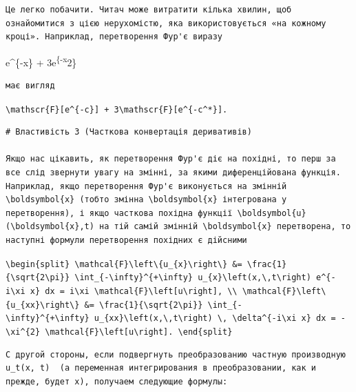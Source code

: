 \documentclass[
  ukrainian,
]{article}
\begin{document}
\begin{verbatim}
Це легко побачити. Читач може витратити кілька хвилин, щоб ознайомитися з цією нерухомістю, яка використовується «на кожному кроці». Наприклад, перетворення Фур'є виразу
\end{verbatim}

e\^{}\{-x\} + 3e\textsuperscript{\{-x}2\}

\begin{verbatim}
має вигляд
\end{verbatim}

\texttt{\textbackslash{}mathscr\{F\}{[}e\^{}\{-c\}{]}\ +\ 3\textbackslash{}mathscr\{F\}{[}e\^{}\{-c\^{}*\}{]}.}

\begin{verbatim}
# Властивість 3 (Часткова конвертація деривативів)

Якщо нас цікавить, як перетворення Фур'є діє на похідні, то перш за все слід звернути увагу на змінні, за якими диференційована функція. Наприклад, якщо перетворення Фур'є виконується на змінній \boldsymbol{x} (тобто змінна \boldsymbol{x} інтегрована у перетворення), і якщо часткова похідна функції \boldsymbol{u}(\boldsymbol{x},t) на тій самій змінній \boldsymbol{x} перетворена, то наступні формули перетворення похідних є дійсними
\end{verbatim}

\texttt{\textbackslash{}begin\{split\}\ \textbackslash{}mathcal\{F\}\textbackslash{}left\textbackslash{}\{u\_\{x\}\textbackslash{}right\textbackslash{}\}\ \&=\ \textbackslash{}frac\{1\}\{\textbackslash{}sqrt\{2\textbackslash{}pi\}\}\ \textbackslash{}int\_\{-\textbackslash{}infty\}\^{}\{+\textbackslash{}infty\}\ u\_\{x\}\textbackslash{}left(x,\textbackslash{},t\textbackslash{}right)\ e\^{}\{-i\textbackslash{}xi\ x\}\ dx\ =\ i\textbackslash{}xi\ \textbackslash{}mathcal\{F\}\textbackslash{}left{[}u\textbackslash{}right{]},\ \textbackslash{}\textbackslash{}\ \textbackslash{}mathcal\{F\}\textbackslash{}left\textbackslash{}\{u\_\{xx\}\textbackslash{}right\textbackslash{}\}\ \&=\ \textbackslash{}frac\{1\}\{\textbackslash{}sqrt\{2\textbackslash{}pi\}\}\ \textbackslash{}int\_\{-\textbackslash{}infty\}\^{}\{+\textbackslash{}infty\}\ u\_\{xx\}\textbackslash{}left(x,\textbackslash{},t\textbackslash{}right)\ \textbackslash{},\ \textbackslash{}delta\^{}\{-i\textbackslash{}xi\ x\}\ dx\ =\ -\textbackslash{}xi\^{}\{2\}\ \textbackslash{}mathcal\{F\}\textbackslash{}left{[}u\textbackslash{}right{]}.\ \textbackslash{}end\{split\}}

\begin{verbatim}
С другой стороны, если подвергнуть преобразованию частную производную  u_t(x, t)  (а переменная интегрирования в преобразовании, как и прежде, будет x), получаем следующие формулы:
\end{verbatim}
\end{document}
